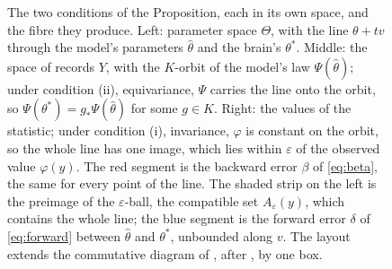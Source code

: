 \documentclass[11pt]{article}
\begin{document}
\begin{figure}[htbp]
{}
\caption{The two conditions of the Proposition, each in its own space, and the fibre they produce. Left: parameter space $\Theta$, with the line $\theta+tv$ through the model's parameters $\hat\theta$ and the brain's $\theta^{*}$. Middle: the space of records $Y$, with the $K$-orbit of the model's law $\Psi(\hat\theta)$; under condition (ii), equivariance, $\Psi$ carries the line onto the orbit, so $\Psi(\theta^{*})=g_*\Psi(\hat\theta)$ for some $g\in K$. Right: the values of the statistic; under condition (i), invariance, $\varphi$ is constant on the orbit, so the whole line has one image, which lies within $\varepsilon$ of the observed value $\varphi(y)$. The red segment is the backward error $\beta$ of \eqref{eq:beta}, the same for every point of the line. The shaded strip on the left is the preimage of the $\varepsilon$-ball, the compatible set $A_\varepsilon(y)$, which contains the whole line; the blue segment is the forward error $\delta$ of \eqref{eq:forward} between $\hat\theta$ and $\theta^{*}$, unbounded along $v$. The layout extends the commutative diagram of \textcite[\S2]{corless2016}, after \textcite[Fig.~1.1]{higham2002}, by one box.}
\label{fig:prop}
\end{figure}
\end{document}
